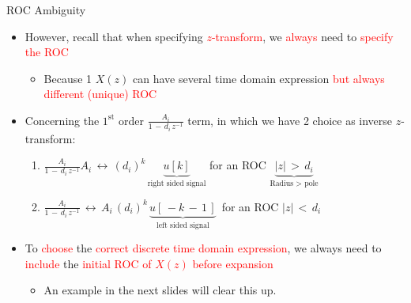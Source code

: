 \begin{frame}[t]{ROC Ambiguity}

\begin{itemize}

\item However, recall that when specifying \textcolor{red}{$z$-transform}, we \textcolor{red}{always} need to \textcolor{red}{specify the ROC}

	\begin{itemize}
	\item Because 1 $X(z)$ can have several time domain expression \textcolor{red}{but always different (unique) ROC}	
	\end{itemize}

\item Concerning the $1^{\mathrm{st}}$ order $\frac{A_i}{1 \, - \, d_i \, z^{-1}}$ term, in which we have 2 choice as inverse $z$-transform:

	\begin{enumerate}
	\item $ \displaystyle\frac{A_i}{1 \, - \, d_i \, z^{-1}} A_i \, \leftrightarrow \, (d_i)^k \, \underbrace{u[k] }_{\text{right sided signal}} $ for an ROC $\underbrace{|z| \, > \, d_i}_{\text{Radius $>$ pole}}$
	
	\item  $ \displaystyle\frac{A_i}{1 \, - \, d_i \, z^{-1}} \, \leftrightarrow \, A_i \, (d_i)^k \, \underbrace{ u[\, -k \, - \, 1 \,] }_{\text{left sided signal}}\, $ for an ROC $|z| \, < \, d_i$
	\end{enumerate}

\item To \textcolor{red}{choose} the \textcolor{red}{correct discrete time domain expression}, we always need to \textcolor{red}{include} the \textcolor{red}{initial ROC of $X(z)$ before expansion}

	\begin{itemize}
	\item An example in the next slides will clear this up.
	\end{itemize}
\end{itemize}

\end{frame}


